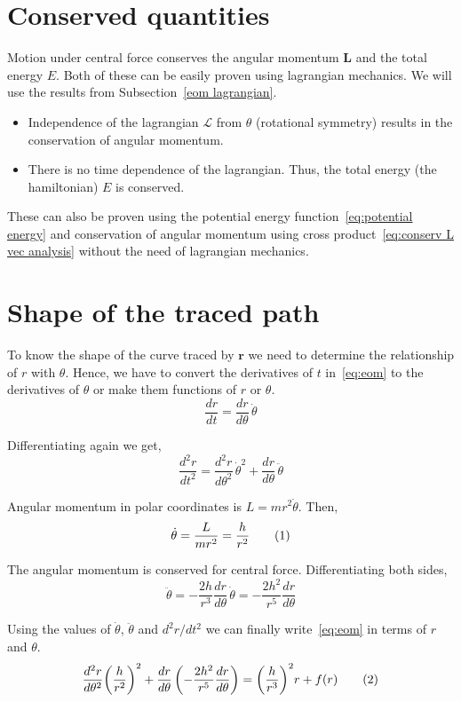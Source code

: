 \documentclass[a4paper, 12pt]{article}
\renewcommand{\indent}{\hspace{3ex}}
\newcommand\labelthis[1]{\addtocounter{equation}{1}\tag{\theequation}\label{#1}}
\renewcommand{\r}{\mathbf{r}}
\renewcommand{\vec}[1]{\mathbf{#1}}
\newcommand{\ddt}[1]{\frac{d#1}{dt}}
\newcommand{\ddtII}[1]{\frac{d^2#1}{dt^2}}
\newcommand{\ddth}[1]{\frac{d#1}{d\theta}}
\newcommand{\ddthII}[1]{\frac{d^2#1}{d\theta^2}}
\newcommand{\Lagr}{\mathcal{L}}
\begin{document}
\section{Conserved quantities}\label{conserved quantities}

\indent Motion under central force conserves the angular momentum $\vec{L}$ and the total energy $E$. Both of these can be easily proven using lagrangian mechanics. We will use the results from Subsection~\ref{eom lagrangian}.
\begin{itemize}
	\item Independence of the lagrangian $\Lagr$ from $\theta$ (rotational symmetry) results in the conservation of angular momentum.
	\item There is no time dependence of the lagrangian. Thus, the total energy (the hamiltonian) $E$ is conserved.
\end{itemize}

\indent These can also be proven using the potential energy function~\eqref{eq:potential energy} and conservation of angular momentum using cross product~\eqref{eq:conserv L vec analysis} without the need of lagrangian mechanics.

\section{Shape of the traced path}\label{shape of path}

\indent To know the shape of the curve traced by $\r$ we need to determine the relationship of $r$ with $\theta$. Hence, we have to convert the derivatives of $t$ in~\eqref{eq:eom} to the derivatives of $\theta$ or make them functions of $r$ or $\theta$.
\[ \ddt{r} = \frac{d r}{d\theta} \, \dot{\theta} \]

Differentiating again we get,
\[ \ddtII{r} = \ddthII{r} \, \dot{\theta}^2 + \ddth{r} \, \ddot{\theta} \]

Angular momentum in polar coordinates is $L = m r^2 \dot{\theta}$. Then,
\[ \dot{\theta} = \frac{L}{m r^2} = \frac{h}{r^2} \labelthis{eq:ddttheta} \]

The angular momentum is conserved for central force. Differentiating both sides,
\[ \ddot{\theta} = - \frac{2h}{r^3} \ddth{r} \, \dot{\theta} = - \frac{2h^2}{r^5} \ddth{r} \]

Using the values of $\dot{\theta}$, $\ddot{\theta}$ and $d^2 r/dt^2$ we can finally
write~\eqref{eq:eom} in terms of $r$ and $\theta$.
\[ \ddthII{r} {\left( \frac{h}{r^2} \right)}^2 + \ddth{r} \left( - \frac{2h^2}{r^5} \ddth{r} \right)
= {\left( \frac{h}{r^3} \right)}^2 r + f(r) \labelthis{eq:messy eqn}\]
\end{document}
